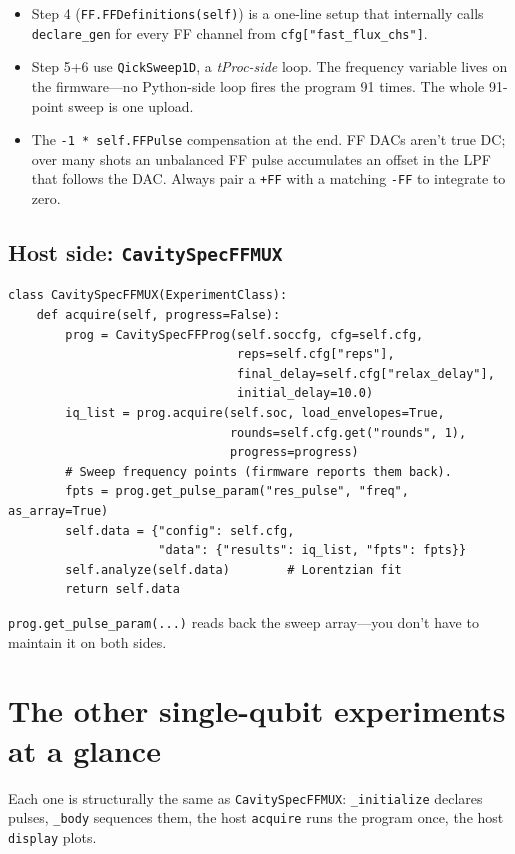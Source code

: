 \documentclass[11pt,letterpaper]{article}
\begin{document}
\begin{itemize}[leftmargin=*]
  \item Step 4 (\texttt{FF.FFDefinitions(self)}) is a one-line setup that internally calls \texttt{declare\_gen} for every FF channel from \texttt{cfg["fast\_flux\_chs"]}.
  \item Step 5+6 use \texttt{QickSweep1D}, a \emph{tProc-side} loop. The frequency variable lives on the firmware---no Python-side loop fires the program 91 times. The whole 91-point sweep is one upload.
  \item The \texttt{-1 * self.FFPulse} compensation at the end. FF DACs aren't true DC; over many shots an unbalanced FF pulse accumulates an offset in the LPF that follows the DAC. Always pair a \texttt{+FF} with a matching \texttt{-FF} to integrate to zero.
\end{itemize}

\subsection{Host side: \texttt{CavitySpecFFMUX}}
\begin{lstlisting}
class CavitySpecFFMUX(ExperimentClass):
    def acquire(self, progress=False):
        prog = CavitySpecFFProg(self.soccfg, cfg=self.cfg,
                                reps=self.cfg["reps"],
                                final_delay=self.cfg["relax_delay"],
                                initial_delay=10.0)
        iq_list = prog.acquire(self.soc, load_envelopes=True,
                               rounds=self.cfg.get("rounds", 1),
                               progress=progress)
        # Sweep frequency points (firmware reports them back).
        fpts = prog.get_pulse_param("res_pulse", "freq", as_array=True)
        self.data = {"config": self.cfg,
                     "data": {"results": iq_list, "fpts": fpts}}
        self.analyze(self.data)        # Lorentzian fit
        return self.data
\end{lstlisting}
\texttt{prog.get\_pulse\_param(...)} reads back the sweep array---you don't have to maintain it on both sides.

\section{The other single-qubit experiments at a glance}
Each one is structurally the same as \texttt{CavitySpecFFMUX}: \texttt{\_initialize} declares pulses, \texttt{\_body} sequences them, the host \texttt{acquire} runs the program once, the host \texttt{display} plots.
\end{document}
